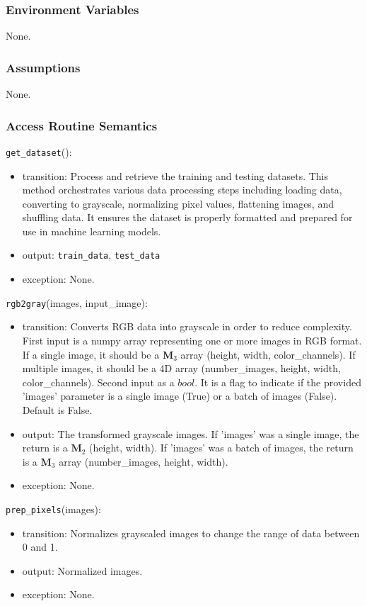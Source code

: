 \documentclass[12pt, titlepage]{article}
\def\code#1{\texttt{#1}}
\begin{document}
\subsubsection{Environment Variables}
None.

\subsubsection{Assumptions}
None.

\subsubsection{Access Routine Semantics}

\noindent \code{get\_dataset}():
\begin{itemize}
  \item transition: Process and retrieve the training and testing datasets.
  This method orchestrates various data processing steps including loading data, 
  converting to grayscale, normalizing pixel values, flattening images, and shuffling data.
  It ensures the dataset is properly formatted and prepared for use in machine learning
  models.
  \item output: \code{train\_data}, \code{test\_data}
  \item exception: None.
\end{itemize}

\noindent \code{rgb2gray}(images, input\_image):
\begin{itemize}
  \item transition: Converts RGB data into grayscale in order to reduce complexity. 
  First input is a numpy array representing one or more images in RGB format. 
  If a single image, it should be a $\mathbf{M}_{3}$ array 
  (height, width, color\_channels). If multiple images, it should be a 4D array 
  (number\_images, height, width, color\_channels).
  Second input as a $bool$. It is a flag to indicate if the provided 'images' 
  parameter is a single image (True) or a batch of images (False). Default is False.
  \item output: The transformed grayscale images. If 'images' was a 
  single image, the return is a $\mathbf{M}_{2}$ (height, width).
  If 'images' was a batch of images, the return is a $\mathbf{M}_{3}$ 
  array (number\_images, height, width).
  \item exception: None.
\end{itemize}

\noindent \code{prep\_pixels}(images):
\begin{itemize}
  \item transition: Normalizes grayscaled images to change the range of data between 0 and 1.
  \item output: Normalized images.
  \item exception: None.
\end{itemize}
\end{document}
